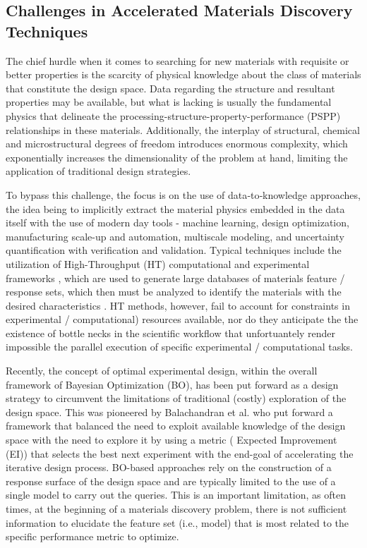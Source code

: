 \documentclass[utf8]{frontiersSCNS} %
\begin{document}
 \subsection{Challenges in Accelerated Materials Discovery Techniques}

 The chief hurdle when it comes to searching for new materials with requisite or better properties is the scarcity of physical knowledge  about the class of materials that constitute the design space. Data regarding the structure and resultant properties may be available, but what is lacking is usually the fundamental physics that delineate the processing-structure-property-performance (PSPP) relationships in these materials. Additionally, the interplay of structural, chemical and microstructural degrees of freedom introduces enormous complexity, which exponentially increases the dimensionality of the problem at hand, limiting the application of traditional design strategies. 

 To bypass this challenge, the focus is on the use of data‐to‐knowledge approaches, the idea being to implicitly extract the material physics embedded in the data itself with the use of modern day tools - machine learning, design optimization, manufacturing scale-up and automation, multiscale modeling, and uncertainty quantification with verification and validation. Typical techniques include the utilization of High-Throughput (HT) computational \cite{HPE1,HPC2,HPC3} and experimental frameworks \cite{HPE1,HPE2,HPE3,HPE4}, which are used to generate large databases of materials feature / response sets, which then must be analyzed \cite{HPC4} to identify the materials with the desired characteristics \cite{solomou2018multi}. HT methods, however, fail to account for  constraints in experimental / computational) resources available, nor do they anticipate the the existence of bottle necks in the scientific workflow that unfortuantely render impossible the parallel execution of specific experimental / computational tasks. 

 Recently, the concept of optimal experimental design, within the overall framework of Bayesian Optimization (BO), has been  put forward as a design strategy to circumvent the limitations of traditional (costly) exploration of the design space. This was pioneered by Balachandran et al. \cite{balachandran2016adaptive} who put forward a framework that balanced the need to exploit available knowledge of the design space with the need to explore it by using a metric ( Expected Improvement (EI)) that selects the best next experiment with the end-goal of accelerating the iterative design process. BO-based approaches rely on the construction of a response surface of the design space and are typically limited to the use of a single model to carry out the queries. This is an important limitation, as often times, at the beginning of a materials discovery problem, there is not sufficient information to elucidate the feature set (i.e., model) that is most related to the specific performance metric to optimize. 
\end{document}
